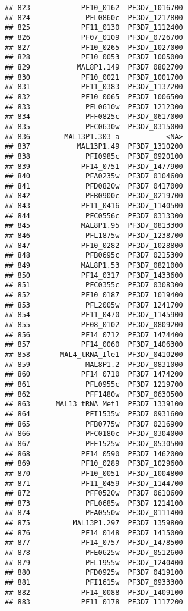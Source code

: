 \documentclass[12pt, a4paper]{article}\usepackage[]{graphicx}\usepackage[]{color}
\makeatletter
\newenvironment{kframe}{%
 \def\at@end@of@kframe{}%
 \ifinner\ifhmode%
  \def\at@end@of@kframe{\end{minipage}}%
  \begin{minipage}{\columnwidth}%
 \fi\fi%
 \def\FrameCommand##1{\hskip\@totalleftmargin \hskip-\fboxsep
 \colorbox{shadecolor}{##1}\hskip-\fboxsep
     \hskip-\linewidth \hskip-\@totalleftmargin \hskip\columnwidth}%
 \MakeFramed {\advance\hsize-\width
   \@totalleftmargin\z@ \linewidth\hsize
   \@setminipage}}%
 {\par\unskip\endMakeFramed%
 \at@end@of@kframe}
\newenvironment{knitrout}{}{} %
\makeatother
\begin{document}
\begin{knitrout}
\begin{kframe}
\begin{verbatim}
## 823            PF10_0162  PF3D7_1016700
## 824             PFL0860c  PF3D7_1217800
## 825            PF11_0130  PF3D7_1112400
## 826            PF07_0109  PF3D7_0726700
## 827            PF10_0265  PF3D7_1027000
## 828            PF10_0053  PF3D7_1005000
## 829           MAL8P1.149  PF3D7_0802700
## 830            PF10_0021  PF3D7_1001700
## 831            PF11_0383  PF3D7_1137200
## 832            PF10_0065  PF3D7_1006500
## 833             PFL0610w  PF3D7_1212300
## 834             PFF0825c  PF3D7_0617000
## 835             PFC0630w  PF3D7_0315000
## 836        MAL13P1.303-a           <NA>
## 837           MAL13P1.49  PF3D7_1310200
## 838             PFI0985c  PF3D7_0920100
## 839            PF14_0751  PF3D7_1477900
## 840             PFA0235w  PF3D7_0104600
## 841             PFD0820w  PF3D7_0417000
## 842             PFB0900c  PF3D7_0219700
## 843            PF11_0416  PF3D7_1140500
## 844             PFC0556c  PF3D7_0313300
## 845            MAL8P1.95  PF3D7_0813300
## 846             PFL1875w  PF3D7_1238700
## 847            PF10_0282  PF3D7_1028800
## 848             PFB0695c  PF3D7_0215300
## 849            MAL8P1.53  PF3D7_0821000
## 850            PF14_0317  PF3D7_1433600
## 851             PFC0355c  PF3D7_0308300
## 852            PF10_0187  PF3D7_1019400
## 853             PFL2005w  PF3D7_1241700
## 854            PF11_0470  PF3D7_1145900
## 855            PF08_0102  PF3D7_0809200
## 856            PF14_0712  PF3D7_1474400
## 857            PF14_0060  PF3D7_1406300
## 858       MAL4_tRNA_Ile1  PF3D7_0410200
## 859             MAL8P1.2  PF3D7_0831000
## 860            PF14_0710  PF3D7_1474200
## 861             PFL0955c  PF3D7_1219700
## 862             PFF1480w  PF3D7_0630500
## 863      MAL13_tRNA_Met1  PF3D7_1339100
## 864             PFI1535w  PF3D7_0931600
## 865             PFB0775w  PF3D7_0216900
## 866             PFC0180c  PF3D7_0304000
## 867             PFE1525w  PF3D7_0530500
## 868            PF14_0590  PF3D7_1462000
## 869            PF10_0289  PF3D7_1029600
## 870            PF10_0051  PF3D7_1004800
## 871            PF11_0459  PF3D7_1144700
## 872             PFF0520w  PF3D7_0610600
## 873             PFL0685w  PF3D7_1214100
## 874             PFA0550w  PF3D7_0111400
## 875          MAL13P1.297  PF3D7_1359800
## 876            PF14_0148  PF3D7_1415000
## 877            PF14_0757  PF3D7_1478500
## 878             PFE0625w  PF3D7_0512600
## 879             PFL1955w  PF3D7_1240400
## 880             PFD0925w  PF3D7_0419100
## 881             PFI1615w  PF3D7_0933300
## 882            PF14_0088  PF3D7_1409100
## 883            PF11_0178  PF3D7_1117200

\end{verbatim}
\end{kframe}
\end{knitrout}
\end{document}
